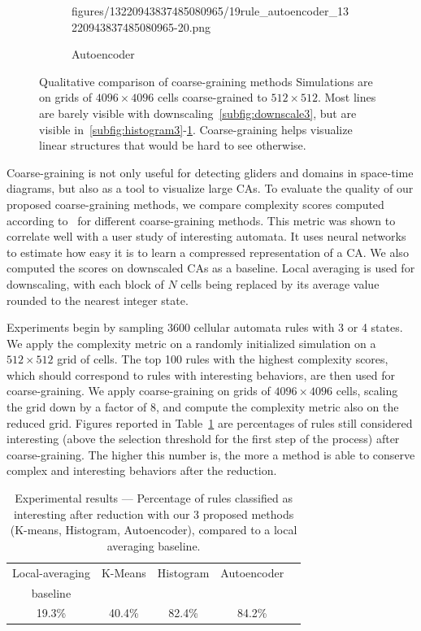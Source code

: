 \begin{figure}[th]
\begin{subfigure}{.48\linewidth}
{    {figures/13220943837485080965/19rule_autoencoder_13220943837485080965-20.png}}
    \caption{\label{subfig:autoencoder3}Autoencoder}
  \end{subfigure}
  \caption{ Qualitative comparison of coarse-graining methods Simulations are on
    grids of $4096 \times 4096$ cells coarse-grained to $512 \times 512$. Most lines
    are barely visible with downscaling~\ref{subfig:downscale3}, but are visible
    in~\ref{subfig:histogram3}-\ref{subfig:autoencoder3}. Coarse-graining helps
    visualize linear structures that would be hard to see
    otherwise.\label{fig:qualitative}}
\end{figure}

Coarse-graining is not only useful for detecting gliders and domains in
space-time diagrams, but also as a tool to visualize large CAs. To evaluate the
quality of our proposed coarse-graining methods, we compare complexity scores
computed according to~\parencite{cisnerosEvolvingStructuresComplex2019} for different
coarse-graining methods. This metric was shown to correlate well with a user
study of interesting automata. It uses neural networks to estimate how easy it
is to learn a compressed representation of a CA\@. We also computed the scores on
downscaled CAs as a baseline. Local averaging is used for downscaling, with each
block of $N$ cells being replaced by its average value rounded to the nearest
integer state.

Experiments begin by sampling 3600 cellular automata rules with 3 or 4 states.
We apply the complexity metric on a randomly initialized simulation on a $512
\times 512$ grid of cells. The top 100 rules with the highest complexity scores,
which should correspond to rules with interesting behaviors, are then used for
coarse-graining. We apply coarse-graining on grids of $4096 \times 4096$ cells,
scaling the grid down by a factor of $8$, and compute the complexity metric also
on the reduced grid. Figures reported in Table~\ref{tab:experiments_table_vc} are
percentages of rules still considered interesting (above the selection threshold
for the first step of the process) after coarse-graining. The higher this number
is, the more a method is able to conserve complex and interesting behaviors
after the reduction.

\begin{table}[htbp]
  \centering
  \begin{tabular}{ccccc}
    \toprule
       Local-averaging & K-Means & Histogram & Autoencoder\\
     baseline &  & & \\
    \midrule
      19.3\%  & 40.4\% & 82.4\% & 84.2\%\\
    \bottomrule
  \end{tabular}
  \caption{Experimental results --- Percentage of rules classified as
      interesting after reduction with our 3 proposed
      methods (K-means, Histogram, Autoencoder), compared to a local averaging
      baseline.}\label{tab:experiments_table_vc}
\end{table}


